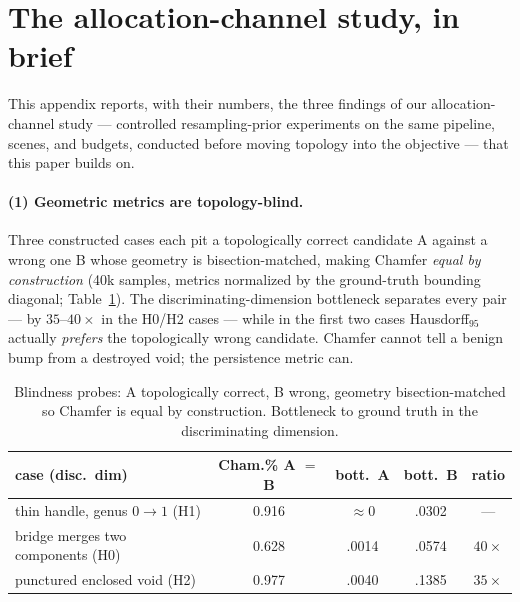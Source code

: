 \section{The allocation-channel study, in brief}
\label{app:companion}


This appendix reports, with their numbers, the three findings of our
allocation-channel study --- controlled resampling-prior experiments on the
same pipeline, scenes, and budgets, conducted before moving topology into
the objective --- that this paper builds on.

\paragraph{(1) Geometric metrics are topology-blind.} Three constructed
cases each pit a topologically correct candidate A against a wrong one B
whose geometry is bisection-matched, making Chamfer \emph{equal by
construction} (40k samples, metrics normalized by the ground-truth bounding
diagonal; Table~\ref{tab:blindness}). The discriminating-dimension
bottleneck separates every pair --- by $35$--$40\times$ in the H0/H2 cases
--- while in the first two cases Hausdorff$_{95}$ actually \emph{prefers}
the topologically wrong candidate. Chamfer cannot tell a benign bump from a
destroyed void; the persistence metric can.

\begin{table}[t]
\centering
\caption{Blindness probes: A topologically correct, B wrong, geometry
bisection-matched so Chamfer is equal by construction. Bottleneck to ground
truth in the discriminating dimension.}
\label{tab:blindness}
\small
\begin{tabular}{lcccc}
\toprule
case (disc.\ dim) & Cham.\% A $=$ B & bott.\ A & bott.\ B & ratio \\
\midrule
thin handle, genus $0{\to}1$ (H1) & 0.916 & ${\approx}0$ & .0302 & --- \\
bridge merges two components (H0) & 0.628 & .0014 & .0574 & $40\times$ \\
punctured enclosed void (H2)      & 0.977 & .0040 & .1385 & $35\times$ \\
\bottomrule
\end{tabular}
\end{table}

